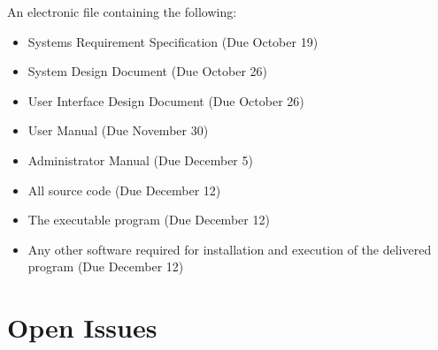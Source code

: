\documentclass{article}
\begin{document}
\vspace{5mm}

An electronic file containing the following: 

\vspace{2.5mm}

\begin{adjustwidth}{2em}{0pt}
\begin{itemize}

\item Systems Requirement Specification (Due October 19)
\item System Design Document (Due October 26)
\item User Interface Design Document (Due October 26)
\item User Manual (Due November 30)
\item Administrator Manual (Due December 5)
\item All source code (Due December 12)
\item The executable program (Due December 12)
\item Any other software required for installation and execution of the delivered program (Due December 12)

\end{itemize}
\end{adjustwidth}


\section{Open Issues}\label{sec:openIssues}

\vspace{2.5mm}
\end{document}
